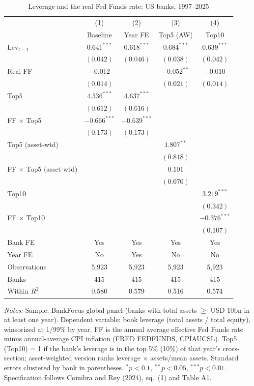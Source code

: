 \begin{table}[htbp]
\centering
\small
\begin{threeparttable}
\caption{Leverage and the real Fed Funds rate: US banks, 1997--2025}
\label{tab:cr_eq1_2}
\begin{tabular}{lcccc}
\toprule
 & (1) & (2) & (3) & (4) \\
 & Baseline & Year FE & Top5 (AW) & Top10 \\
\midrule
Lev$_{t-1}$ & $0.641^{***}$ & $0.618^{***}$ & $0.684^{***}$ & $0.639^{***}$ \\
 & $(0.042)$ & $(0.046)$ & $(0.038)$ & $(0.042)$ \\[2pt]
Real FF & $-0.012$ &  & $-0.052^{**}$ & $-0.010$ \\
 & $(0.014)$ &  & $(0.021)$ & $(0.014)$ \\[2pt]
Top5 & $4.536^{***}$ & $4.637^{***}$ &  &  \\
 & $(0.612)$ & $(0.616)$ &  &  \\[2pt]
FF $\times$ Top5 & $-0.666^{***}$ & $-0.639^{***}$ &  &  \\
 & $(0.173)$ & $(0.173)$ &  &  \\[2pt]
Top5 (asset-wtd) &  &  & $1.807^{**}$ &  \\
 &  &  & $(0.818)$ &  \\[2pt]
FF $\times$ Top5 (asset-wtd) &  &  & $0.101$ &  \\
 &  &  & $(0.070)$ &  \\[2pt]
Top10 &  &  &  & $3.219^{***}$ \\
 &  &  &  & $(0.342)$ \\[2pt]
FF $\times$ Top10 &  &  &  & $-0.376^{***}$ \\
 &  &  &  & $(0.107)$ \\
\midrule
Bank FE & Yes & Yes & Yes & Yes \\
Year FE & No & Yes & No & No \\
Observations & 5,923 & 5,923 & 5,923 & 5,923 \\
Banks & 415 & 415 & 415 & 415 \\
Within $R^2$ & 0.580 & 0.579 & 0.516 & 0.574 \\
\bottomrule
\end{tabular}
\begin{tablenotes}[flushleft]
\footnotesize
\item \textit{Notes:} Sample: BankFocus global panel (banks with total assets $\geq$ USD 10bn in at least one year). Dependent variable: book leverage (total assets / total equity), winsorized at 1/99\% by year. FF is the annual average effective Fed Funds rate minus annual-average CPI inflation (FRED FEDFUNDS, CPIAUCSL). Top5 (Top10) = 1 if the bank's leverage is in the top 5\% (10\%) of that year's cross-section; asset-weighted version ranks leverage $\times$ assets/mean assets. Standard errors clustered by bank in parentheses. $^{*}p<0.1$, $^{**}p<0.05$, $^{***}p<0.01$. Specification follows Coimbra and Rey (2024), eq.~(1) and Table A1.
\end{tablenotes}
\end{threeparttable}
\end{table}
